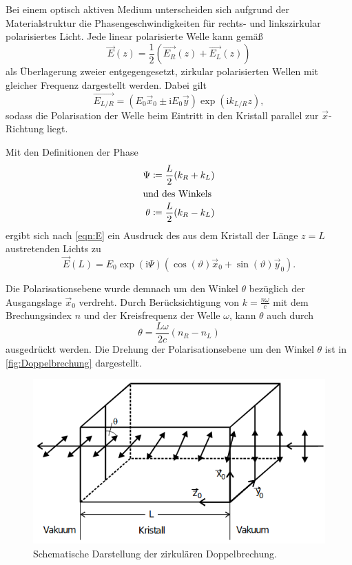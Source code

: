 Bei einem optisch aktiven Medium unterscheiden sich aufgrund der Materialstruktur die Phasengeschwindigkeiten für rechts- und linkszirkular
polarisiertes Licht.
Jede linear polarisierte Welle kann gemäß
\begin{equation}
    \vec{E}(z)=\frac{1}{2}(\vec{E_R}(z)+\vec{E_L}(z))
    \label{eqn:E}   
\end{equation}
als Überlagerung zweier entgegengesetzt, zirkular polarisierten Wellen mit gleicher Frequenz dargestellt werden. Dabei gilt
\begin{equation*}
    \vec{E_{L/R}}=(E_0\vec{x}_0\pm \text{i}E_0\vec{y})\exp{(\text{i}k_{L/R}z)},
\end{equation*}
sodass die Polarisation der Welle beim Eintritt in den Kristall parallel zur $\vec{x}$-Richtung liegt.

Mit den Definitionen der Phase
\begin{align*}
    \Psi  &\coloneqq \frac{L}{2}(k_R+k_L)\\
    \shortintertext{und des Winkels}
    \theta&\coloneqq \frac{L}{2}(k_R-k_L)
\end{align*}
ergibt sich nach \autoref{eqn:E} ein Ausdruck des aus dem Kristall der Länge $z=L$ austretenden Lichts zu 
\begin{equation*}
    \vec{E}(L)=E_0 \exp(\text{i}\Psi)\left(\cos(\vartheta) \vec{x}_0 + \sin(\vartheta)\vec{y}_0\right).
\end{equation*}


Die Polarisationsebene wurde demnach um den Winkel $\theta$ bezüglich der Ausgangslage $\vec{x}_0$ verdreht. Durch
Berücksichtigung von $k=\frac{n \omega}{c}$ mit dem Brechungsindex $n$ und der Kreisfrequenz der Welle $\omega$,
kann $\theta$ auch durch 
\begin{equation*}
    \theta=\frac{L\omega}{2c}(n_R-n_L)
\end{equation*}
ausgedrückt werden. Die Drehung der Polarisationsebene um den Winkel $\theta$ ist in \autoref{fig:Doppelbrechung} dargestellt.

\begin{figure}[H]
    \centering
    \includegraphics[scale=0.7]{Abbildungen/Doppelbrechung.png}
    \caption{Schematische Darstellung der zirkulären Doppelbrechung.\cite{V46_Anhang}}
    \label{fig:Doppelbrechung}
\end{figure}

